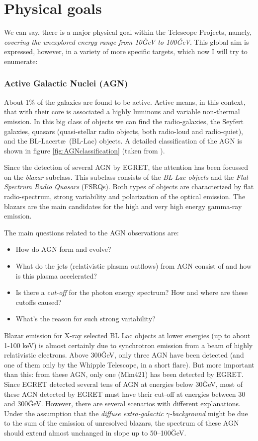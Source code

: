 \CGROenergiesfig

\section{Physical goals}
%
We can say, there is a major physical goal within the \MAGIC Telescope
Projects, namely, \emph{covering the unexplored energy range from 10\u{GeV}
to 100\u{GeV}}. This global aim is expressed, however, in a variety of
more specific targets, which now I will try to enumerate:

\subsubsection*{Active Galactic Nuclei (AGN)} 
%
About 1\% of the galaxies are found to be active. Active means, in
this context, that with their core is associated a highly luminous and
variable non-thermal emission. In this big class of objects we can
find the radio-galaxies, the Seyfert galaxies, quasars (quasi-stellar
radio objects, both radio-loud and radio-quiet), and the BL-Lacert\ae\
(BL-Lac) objects. A detailed classification of the AGN is shown in
figure \ref{fig:AGNclassification} (taken from
\cite{Petry:tesis}).

\AGNclassificationfig

Since the detection of several AGN by EGRET, the attention has been
focussed on the \emph{blazar} subclass. This subclass consists of the
\emph{BL Lac objects} and the \emph{Flat Spectrum Radio Quasars}
(FSRQs). Both types of objects are characterized by flat
radio-spectrum, strong variability and polarization of the optical
emission. The blazars are the main candidates for the high and very
high energy gamma-ray emission.

The main questions related to the AGN observations are:
%
\begin{itemize}
\item How do AGN form and evolve?
\item What do the jets (relativistic plasma outflows) from AGN consist
of and how is this plasma accelerated?
\item Is there a \emph{cut-off} for the photon energy spectrum? How
and where are these cutoffs caused?
\item What's the reason for such strong variability?
\end{itemize}

Blazar emission for X-ray selected BL Lac objects at lower energies
(up to about 1-100 keV) is almost certainly due to synchrotron
emission from a beam of highly relativistic electrons. Above
300\u{GeV}, only three AGN have been detected (and one of them only by
the Whipple Telescope, in a short flare). But more important than
this: from these AGN, only one (Mkn421) has been detected by
EGRET. Since EGRET detected several tens of AGN at energies below
30\u{GeV}, most of these AGN detected by EGRET must have their cut-off
at energies between 30 and 300\u{GeV}. However, there are several
scenarios with different explanations. Under the assumption that the
\emph{diffuse extra-galactic $\gamma$-background} might be due to the
sum of the emission of unresolved blazars, the spectrum of these AGN
should extend almost unchanged in slope up to 50--100\u{GeV}.

